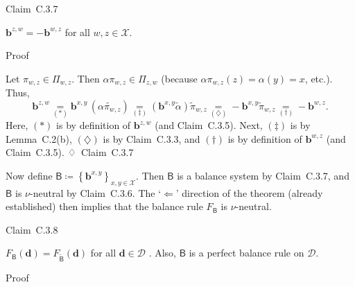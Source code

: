 \documentclass[
]{article}
\begin{document}
Claim~C.3.7

\(\mathbf{b}^{z,w} = - \mathbf{b}^{w,z}\) for all
\(w,z \in \mathcal{X}\).

Proof

Let \(\pi_{w,z} \in \Pi_{w,z}\). Then \(\alpha\pi_{w,z} \in \Pi_{z,w}\)
(because \(\alpha\pi_{w,z}(z) = \alpha(y) = x\), etc.). Thus,
\[\mathbf{b}^{z,w}\underset{( \ast )}{=}\mathbf{b}^{x,y}\,\left( \widetilde{\alpha\pi_{w,z}} \right)\underset{( \ddagger )}{=}\left( \mathbf{b}^{x,y}\widetilde{\alpha} \right){\widetilde{\pi}}_{w,z}\underset{(\diamondsuit)}{=} - \mathbf{b}^{x,y}{\widetilde{\pi}}_{w,z}\underset{( \dagger )}{=} - \mathbf{b}^{w,z}\text{.}\]
Here, \(( \ast )\) is by definition of \(\mathbf{b}^{z,w}\) (and
Claim~C.3.5). Next, \(( \ddagger )\) is by Lemma~C.2(b),
\((\diamondsuit)\) is by Claim~C.3.3, and \(( \dagger )\) is by
definition of \(\mathbf{b}^{w,z}\) (and Claim~C.3.5). ♢~Claim~C.3.7

Now define
\(\mathsf{B} ≔ \left\{ \mathbf{b}^{x,y} \right\}_{x,y \in \mathcal{X}}\).
Then \(\mathsf{B}\) is a balance system by Claim~C.3.7, and
\(\mathsf{B}\) is \(\nu\)-neutral by Claim~C.3.6. The
`\(\Longleftarrow\)' direction of the theorem (already established) then
implies that the balance rule \(F_{\mathsf{B}}\) is \(\nu\)-neutral.

Claim~C.3.8

\(F_{\mathsf{B}}\left( \mathbf{d} \right) = F_{\widetilde{\mathsf{B}}}\left( \mathbf{d} \right)\)
for all \(\mathbf{d} \in \mathcal{D}\) . Also, \(\mathsf{B}\) is a
perfect balance rule on \(\mathcal{D}\).

Proof
\end{document}
